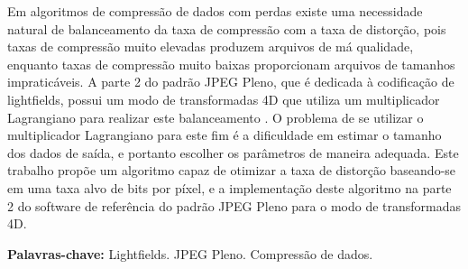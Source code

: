 \begin{resumo}[Resumo]
    Em algoritmos de compressão de dados com perdas existe uma necessidade natural de balanceamento da taxa de compressão com a taxa de distorção,
    pois taxas de compressão muito elevadas produzem arquivos de má qualidade, enquanto taxas de compressão muito baixas proporcionam arquivos de
    tamanhos impraticáveis.
    A parte 2 do padrão JPEG Pleno, que é dedicada à codificação de lightfields, possui um modo de transformadas 4D que utiliza um multiplicador
    Lagrangiano para realizar este balanceamento \cite{4d_codec}. O problema de se utilizar o multiplicador Lagrangiano para este fim é a dificuldade
    em estimar o tamanho dos dados de saída, e portanto escolher os parâmetros de maneira adequada. Este trabalho propõe um algoritmo capaz de 
    otimizar a taxa de distorção baseando-se em uma taxa alvo de bits por píxel, e a implementação deste algoritmo na parte 2 do software de 
    referência do padrão JPEG Pleno para o modo de transformadas 4D.


    \vspace{\baselineskip} 
    \textbf{Palavras-chave:} Lightfields. JPEG Pleno. Compressão de dados.
\end{resumo}
